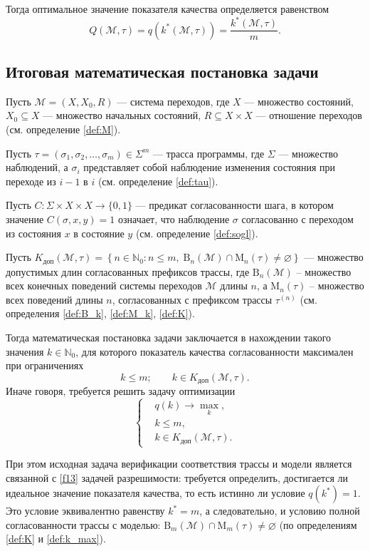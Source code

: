 Тогда оптимальное значение показателя качества определяется равенством
\begin{equation}\label{f12}
Q(\mathcal{M},\tau)
=
q\!\left(k^*(\mathcal{M},\tau)\right)
=
\frac{k^*(\mathcal{M},\tau)}{m}.
\end{equation}

\newpage
\subsection{Итоговая математическая постановка задачи}

Пусть $\mathcal{M} = (X, X_0, R)$ --- система переходов, где $X$ --- множество
состояний, $X_0 \subseteq X$ --- множество начальных состояний, $R \subseteq X
\times X$ --- отношение переходов (см. определение \ref{def:M}).

Пусть $\tau = (\sigma_1,\sigma_2,\dots,\sigma_m) \in \Sigma^m$ --- трасса
программы, где $\Sigma$ --- множество наблюдений, а $\sigma_i$ представляет
собой наблюдение изменения состояния при переходе из $i-1$ в $i$ (см.
определение \ref{def:tau}).

Пусть $C : \Sigma \times X \times X \to \{0,1\}$ --- предикат согласованности
шага, в котором значение $C(\sigma,x,y)=1$ означает, что наблюдение $\sigma$
согласованно с переходом из состояния $x$ в состояние $y$ (см. определение
\ref{def:sogl}).

Пусть $K_{\mathrm{доп}}(\mathcal{M},\tau) = \left\{ n \in \mathbb{N}_{0} : n
\le m,\; \mathrm{B}_n(\mathcal{M}) \cap \mathrm{M}_n(\tau) \neq \varnothing
\right\} $ --- множество допустимых длин согласованных префиксов трассы, где
$\mathrm{B}_n(\mathcal{M})$ -- множество всех конечных поведений системы
переходов $\mathcal{M}$ длины $n$, а $\mathrm{M}_n(\tau)$ -- множество всех
поведений длины $n$, согласованных с префиксом трассы $\tau^{(n)}$ (см.
определения \ref{def:B_k}, \ref{def:M_k}, \ref{def:K}).

Тогда математическая постановка задачи заключается в нахождении такого значения
$k \in \mathbb{N}_{0}$, для которого показатель качества согласованности
максимален при ограничениях
\[
k \le m; \qquad
k \in K_{\mathrm{доп}}(\mathcal{M},\tau).
\]
Иначе говоря, требуется решить задачу оптимизации
\begin{equation}\label{f13}
\left\{
\begin{aligned}
&q(k) \to \max\limits_{k},\\
&k \le m,\\
&k \in K_{\mathrm{доп}}(\mathcal{M},\tau).
\end{aligned}
\right.
\end{equation}

При этом исходная задача верификации соответствия трассы и модели является
связанной с \eqref{f13} задачей разрешимости: требуется определить, достигается
ли идеальное значение показателя качества, то есть истинно ли условие $q(k^*) =
1$. Это условие эквивалентно равенству $k^* = m$, а следовательно, и условию
полной согласованности трассы с моделью: $\mathrm{B}_m(\mathcal{M}) \cap
\mathrm{M}_m(\tau) \neq \varnothing$ (по определениям \ref{def:K} и
\ref{def:k_max}).

